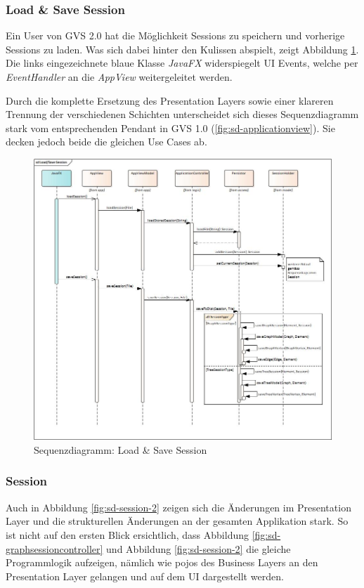 \documentclass[11pt,a4paper,english,oneside]{book}
\numberwithin{equation}{chapter}
\begin{document}
	\subsubsection{Load \& Save Session}
	Ein User von GVS 2.0 hat die Möglichkeit Sessions zu speichern und vorherige Sessions zu laden. Was sich dabei hinter den Kulissen abspielt, zeigt Abbildung \ref{fig:sd-load_save_session-2}. Die links eingezeichnete blaue Klasse \textit{JavaFX} widerspiegelt UI Events, welche per \textit{EventHandler} an die \textit{AppView} weitergeleitet werden.
	
	Durch die komplette Ersetzung des Presentation Layers sowie einer klareren Trennung der verschiedenen Schichten unterscheidet sich dieses Sequenzdiagramm stark vom entsprechenden Pendant in GVS 1.0 (\ref{fig:sd-applicationview}). Sie decken jedoch beide die gleichen Use Cases ab.
	
	\begin{figure}[h!]
		\centering
		\includegraphics[width=\linewidth]{assets/images/sequence_LoadSave_Session}
		\caption{Sequenzdiagramm: Load \& Save Session}
		\label{fig:sd-load_save_session-2}
	\end{figure}
	
	\clearpage
	
	\subsubsection{Session}	
	Auch in Abbildung \ref{fig:sd-session-2} zeigen sich die Änderungen im Presentation Layer und die strukturellen Änderungen an der gesamten Applikation stark. So ist nicht auf den ersten Blick ersichtlich, dass Abbildung \ref{fig:sd-graphsessioncontroller} und Abbildung \ref{fig:sd-session-2} die gleiche Programmlogik aufzeigen, nämlich wie \glspl{pojo} des Business Layers an den Presentation Layer gelangen und auf dem UI dargestellt werden.
	
\end{document}
